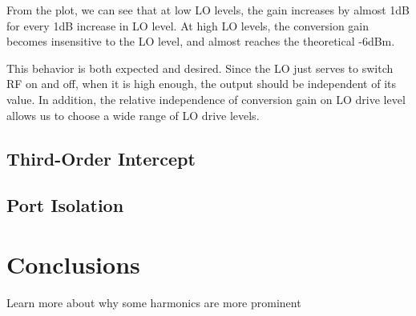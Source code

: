 \documentclass{article}
\begin{document}
From the plot, we can see that at low LO levels, the gain increases by almost 1dB for every 1dB increase in LO level.
At high LO levels, the conversion gain becomes insensitive to the LO level, and almost reaches the theoretical -6dBm.

This behavior is both expected and desired.
Since the LO just serves to switch RF on and off, when it is high enough, the output should be independent of its value.
In addition, the relative independence of conversion gain on LO drive level allows us to choose a wide range of LO drive levels.

\subsection{Third-Order Intercept}

\subsection{Port Isolation}

\section{Conclusions}
Learn more about why some harmonics are more prominent
\end{document}
